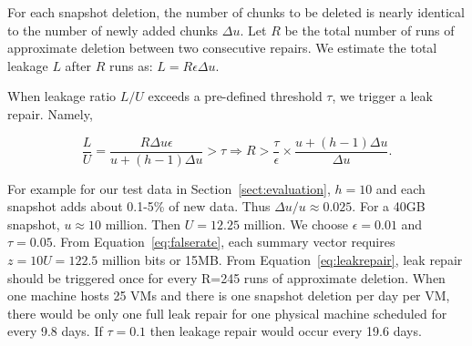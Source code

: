 For each snapshot deletion, the number of chunks to be deleted is nearly identical to the number of
newly added chunks $\Delta u$. 
Let $R$ be the total number of runs of approximate deletion between two consecutive 
repairs. We estimate  the total leakage $L$ after $R$ runs as:
$
L = R \epsilon \Delta u.
$

When leakage ratio $L/U$ exceeds a pre-defined threshold $\tau$, we trigger a leak repair. Namely,

\begin{equation}
\label{eq:leakrepair}
\frac{L}{U} = \frac{R \Delta u \epsilon}{u+(h-1)\Delta u } > \tau 
\Longrightarrow R > \frac{\tau}{\epsilon}\times\frac{u + (h-1)\Delta u}{\Delta u}.
\end{equation}

For example for our test data in Section~\ref{sect:evaluation},  
$h=10$ and each snapshot adds
about 0.1-5\% of new data. Thus ${\Delta u}/{u} \approx 0.025$. For a 40GB snapshot, $u\approx  10$ million.
Then $U=12.25$ million.
We choose  $\epsilon = 0.01$ and $\tau=0.05$.  From Equation~\ref{eq:falserate}, 
each summary vector requires $z=10U=122.5$ million bits or 15MB. From Equation~\ref{eq:leakrepair}, 
leak repair should be triggered once for every R=245 runs of approximate deletion. 
When one machine hosts 25 VMs and there is one snapshot deletion per day per VM, there would be 
only one full leak repair for one physical machine scheduled for every 9.8 days. 
If $\tau = 0.1$ then leakage repair would occur every 19.6 days.

